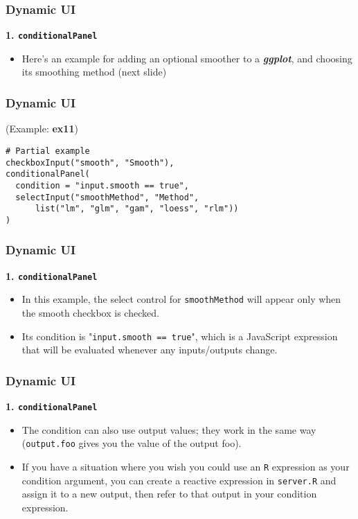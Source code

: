 \documentclass{beamer}
\begin{document}
\begin{frame}
\frametitle{Dynamic UI}
\Large
\vspace{-1cm}
\textbf{1. \texttt{conditionalPanel}}\\
\begin{itemize}
\item Here’s an example for adding an optional smoother to a \textit{\textbf{ggplot}}, and choosing its smoothing method (next slide)
\end{itemize}
\end{frame}

\begin{frame}[fragile]
\frametitle{Dynamic UI}
(Example: \textbf{ex11})
\begin{framed}
\begin{verbatim}
# Partial example
checkboxInput("smooth", "Smooth"),
conditionalPanel(
  condition = "input.smooth == true",
  selectInput("smoothMethod", "Method",
      list("lm", "glm", "gam", "loess", "rlm"))
)
\end{verbatim}
\end{framed}
\end{frame}

\begin{frame}
\frametitle{Dynamic UI}
\Large
\textbf{1. \texttt{conditionalPanel}}\\
\begin{itemize}
\item In this example, the select control for \texttt{smoothMethod} will appear only when the smooth checkbox is checked. 
\item Its condition is "\texttt{input.smooth == true}", which is a JavaScript expression that will be evaluated whenever any inputs/outputs change.
\end{itemize}
\end{frame}
\begin{frame}
\frametitle{Dynamic UI}
\Large
\textbf{1. \texttt{conditionalPanel}}\\
\begin{itemize}
\item The condition can also use output values; they work in the same way (\texttt{output.foo} gives you the value of the output foo). \item If you have a situation where you wish you could use an \texttt{R} expression as your condition argument, you can create a reactive expression in \texttt{server.R} and assign it to a new output, then refer to that output in your condition expression. 
\end{itemize}

\end{frame}
\end{document}
